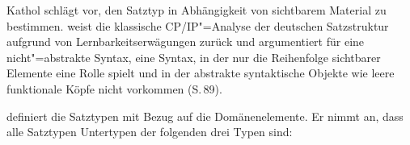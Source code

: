 Kathol schlägt vor, den Satztyp in Abhängigkeit von sichtbarem Material zu bestimmen.
\citet{Kathol97a} weist die klassische CP/IP"=Analyse der deutschen Satzstruktur aufgrund von
Lernbarkeitserwägungen zurück und argumentiert für eine nicht"=abstrakte Syntax, \dash
eine Syntax, in der nur die Reihenfolge sichtbarer Elemente eine Rolle spielt und in der
abstrakte syntaktische Objekte wie \zb leere funktionale Köpfe nicht vorkommen (S.\,89).


\citet[, 60]{Kathol2001a} definiert die Satztypen mit Bezug auf die Domänenelemente.
Er nimmt an, dass alle Satztypen Untertypen der folgenden drei Typen sind:
\eal
\label{clause-types}
\ex\label{v1-clause-type}  \impl {}

